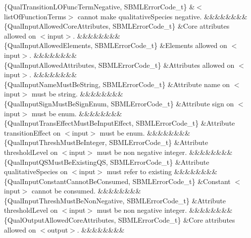 \begin{DoxyParagraph}{}
\begin{longtabu}
\{Qual\+Transition\+L\+O\+Func\+Term\+Negative, S\+B\+M\+L\+Error\+Code\+\_\+t\} &{\ttfamily $<$list\+Of\+Function\+Terms$>$} cannot make qualitative\+Species negative. &&&&&&&&\\
\{Qual\+Input\+Allowed\+Core\+Attributes, S\+B\+M\+L\+Error\+Code\+\_\+t\} &Core attributes allowed on {\ttfamily $<$input$>$}. &&&&&&&&\\
\{Qual\+Input\+Allowed\+Elements, S\+B\+M\+L\+Error\+Code\+\_\+t\} &Elements allowed on {\ttfamily $<$input$>$}. &&&&&&&&\\
\{Qual\+Input\+Allowed\+Attributes, S\+B\+M\+L\+Error\+Code\+\_\+t\} &Attributes allowed on {\ttfamily $<$input$>$}. &&&&&&&&\\
\{Qual\+Input\+Name\+Must\+Be\+String, S\+B\+M\+L\+Error\+Code\+\_\+t\} &Attribute \textquotesingle{}name\textquotesingle{} on {\ttfamily $<$input$>$} must be string. &&&&&&&&\\
\{Qual\+Input\+Sign\+Must\+Be\+Sign\+Enum, S\+B\+M\+L\+Error\+Code\+\_\+t\} &Attribute \textquotesingle{}sign\textquotesingle{} on {\ttfamily $<$input$>$} must be enum. &&&&&&&&\\
\{Qual\+Input\+Trans\+Effect\+Must\+Be\+Input\+Effect, S\+B\+M\+L\+Error\+Code\+\_\+t\} &Attribute \textquotesingle{}transition\+Effect\textquotesingle{} on {\ttfamily $<$input$>$} must be enum. &&&&&&&&\\
\{Qual\+Input\+Thresh\+Must\+Be\+Integer, S\+B\+M\+L\+Error\+Code\+\_\+t\} &Attribute \textquotesingle{}threshold\+Level\textquotesingle{} on {\ttfamily $<$input$>$} must be non negative integer. &&&&&&&&\\
\{Qual\+Input\+Q\+S\+Must\+Be\+Existing\+QS, S\+B\+M\+L\+Error\+Code\+\_\+t\} &Attribute \textquotesingle{}qualitative\+Species\textquotesingle{} on {\ttfamily $<$input$>$} must refer to existing &&&&&&&&\\
\{Qual\+Input\+Constant\+Cannot\+Be\+Consumed, S\+B\+M\+L\+Error\+Code\+\_\+t\} &Constant {\ttfamily $<$input$>$} cannot be consumed. &&&&&&&&\\
\{Qual\+Input\+Thresh\+Must\+Be\+Non\+Negative, S\+B\+M\+L\+Error\+Code\+\_\+t\} &Attribute \textquotesingle{}threshold\+Level\textquotesingle{} on {\ttfamily $<$input$>$} must be non negative integer. &&&&&&&&\\
\{Qual\+Output\+Allowed\+Core\+Attributes, S\+B\+M\+L\+Error\+Code\+\_\+t\} &Core attributes allowed on {\ttfamily $<$output$>$}. &&&&&&&&\\

\end{longtabu}
\end{DoxyParagraph}
